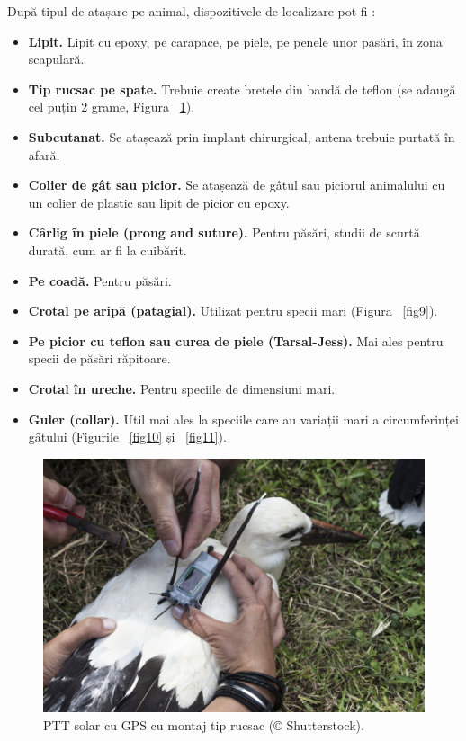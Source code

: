 \documentclass[11pt,onehalfspacing]{elife}
\begin{document}
După tipul de atașare pe animal, dispozitivele de localizare pot fi \citep{Silvy2012}:
\begin{itemize}
    \item \textbf{Lipit.} Lipit cu epoxy, pe carapace, pe piele, pe penele unor pasări, în zona scapulară.
  \item \textbf{Tip rucsac pe spate.} Trebuie create bretele din bandă de teflon (se adaugă cel puțin 2 grame, Figura ~\ref{fig8}).
    \item \textbf{Subcutanat.} Se atașează prin implant chirurgical, antena trebuie purtată în afară.
    \item \textbf{Colier de gât sau picior.} Se atașează de gâtul sau piciorul animalului cu un colier de plastic sau lipit de picior cu epoxy.
    \item \textbf{Cârlig în piele (prong and suture).} Pentru păsări, studii de scurtă durată, cum ar fi la cuibărit.
    \item \textbf{Pe coadă.} Pentru păsări.
    \item \textbf{Crotal pe aripă (patagial).} Utilizat pentru specii mari (Figura ~\ref{fig9}).
    \item \textbf{Pe picior cu teflon sau curea de piele (Tarsal-Jess).} Mai ales pentru specii de păsări răpitoare.
    \item \textbf{Crotal în ureche.} Pentru speciile de dimensiuni mari.
    \item \textbf{Guler (collar).} Util mai ales la speciile care au variații mari a circumferinței gâtului (Figurile ~\ref{fig10} și ~\ref{fig11}).
\end{itemize}
\begin{figure}[ht]
\includegraphics[width=\textwidth]{Fig8.jpg}
\caption{PTT solar cu GPS cu montaj tip rucsac (© Shutterstock).} \label{fig8}
\end{figure}
\end{document}
